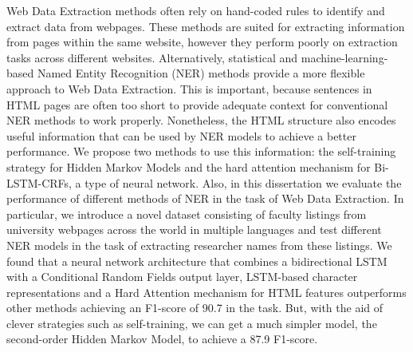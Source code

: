 Web Data Extraction methods often rely on hand-coded rules to 
identify and extract data from webpages. These methods are
suited for extracting information from pages within
the same website, however they perform poorly on extraction 
tasks across different websites. Alternatively, statistical and 
machine-learning-based Named Entity Recognition (NER) methods provide a more flexible 
approach to Web Data Extraction. This is important, 
because sentences in HTML pages are often too short to provide adequate 
context for conventional NER methods to work 
properly. Nonetheless, the HTML structure also encodes useful information that 
can be used by NER models to achieve a better performance. We propose two
methods to use this information: the self-training strategy for Hidden Markov
Models and the hard attention mechanism for Bi-LSTM-CRFs, a type of neural network.
Also, in this dissertation we 
evaluate the performance of different methods of NER
in the task of Web Data Extraction. In particular, we introduce a novel 
dataset consisting of faculty listings from university webpages across
the world in multiple languages and test different NER models in the task of 
extracting researcher names from these listings. We found that a 
neural network architecture that combines a bidirectional LSTM with
a Conditional Random Fields output layer, LSTM-based character 
representations and a Hard Attention mechanism for HTML features
outperforms other methods achieving an F1-score of 90.7 in the task.
But, with the aid of clever strategies such as self-training, we can get a 
much simpler model, the second-order Hidden Markov Model, 
to achieve a 87.9 F1-score.



